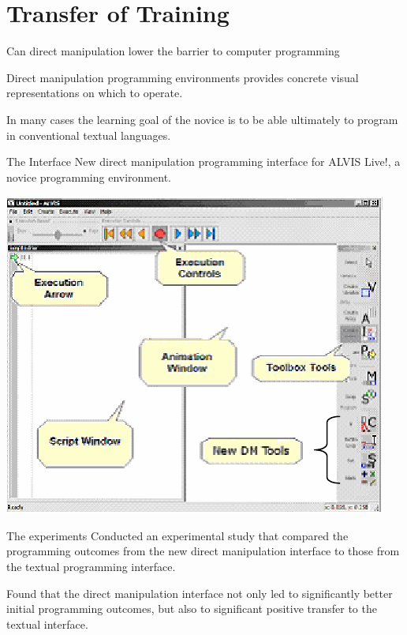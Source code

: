 \section{Transfer of Training}

\begin{frame} {Can direct manipulation lower the barrier to computer programming}
  
  Direct manipulation programming environments provides concrete visual
  representations on which to operate.
  \medskip
  
  In many cases the learning goal of the novice is to be able ultimately to
  program in conventional textual languages.
\end{frame}

\begin{frame} {The Interface}
  New direct manipulation programming interface for
  ALVIS Live!, a novice programming environment.
  \medskip
  
  \includegraphics[scale=0.6]{img/alvis.png}
\end{frame}

\begin{frame} {The experiments}
  Conducted an experimental study that compared the programming
  outcomes from the new direct manipulation interface to those
  from the textual programming interface.
  \medskip
  
  Found that the direct manipulation interface not only led
  to significantly better initial programming outcomes, but
  also to significant positive transfer to the textual interface.
\end{frame}

